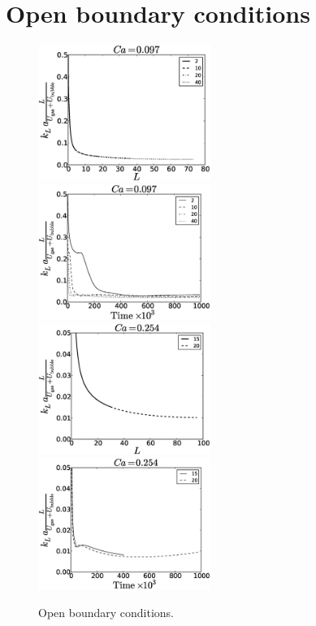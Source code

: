 \documentclass{article}
\begin{document}
\section{Open boundary conditions}
\begin{figure}
\includegraphics[width=0.5\textwidth]{Figures/jos_aver_conc_scale_ca0097.eps}
\includegraphics[width=0.5\textwidth]{Figures/jos_aver_moving_window_ca0097.eps}\\
\includegraphics[width=0.5\textwidth]{Figures/jos_aver_conc_scale_ca0254.eps}
\includegraphics[width=0.5\textwidth]{Figures/jos_aver_moving_window_ca0254.eps}\\
\caption{Open boundary conditions. \label{fig:open:boundary:jos}}
\end{figure}
\end{document}
